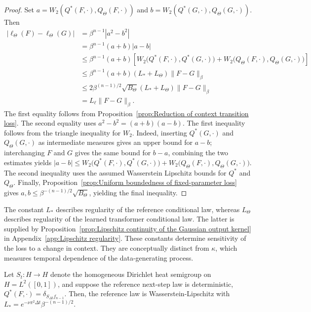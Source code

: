 \begin{proof}
Set \(a=W_2(Q^*(F,\cdot),Q_\Theta(F,\cdot))\) and \(b=W_2(Q^*(G,\cdot),Q_\Theta(G,\cdot))\). Then
\[
\begin{aligned}
|\ell_\Theta(F)-\ell_\Theta(G)|
&=
\beta^{n-1}
|a^2-b^2|
\\
&=
\beta^{n-1}
(a+b)|a-b|
\\
&\leqslant
\beta^{n-1}
(a+b)
\left[
W_2
\bigl(
Q^*(F,\cdot),
Q^*(G,\cdot)
\bigr)
+
W_2
\bigl(
Q_\Theta(F,\cdot),
Q_\Theta(G,\cdot)
\bigr)
\right]
\\
&\leqslant
\beta^{n-1}
(a+b)
(L_*+L_\Theta)
\|F-G\|_\beta
\\
&\leqslant
2
\beta^{(n-1)/2}
\sqrt{B_\Theta}
(L_*+L_\Theta)
\|F-G\|_\beta \\
&= L_\ell\|F-G\|_\beta.
\end{aligned}
\]
The first equality follows from Proposition~\ref{prop:Reduction of context transition loss}. The second equality uses \(a^2-b^2=(a+b)(a-b)\). The first inequality follows from the triangle inequality for \(W_2\). Indeed, inserting \(Q^*(G,\cdot)\) and \(Q_\Theta(G,\cdot)\) as intermediate measures gives an upper bound for \(a-b\); interchanging \(F\) and \(G\) gives the same bound for \(b-a\), combining the two estimates yields
\(
|a-b|
\leqslant
W_2\bigl(Q^*(F,\cdot),Q^*(G,\cdot)\bigr)
+
W_2\bigl(Q_\Theta(F,\cdot),Q_\Theta(G,\cdot)\bigr)
\). The second inequality uses the assumed Wasserstein Lipschitz bounds for \(Q^*\) and \(Q_\Theta\). Finally, Proposition~\ref{prop:Uniform boundedness of fixed-parameter loss} gives \(a,b\leqslant\beta^{-(n-1)/2}\sqrt{B_\Theta}\), yielding the final inequality.
\end{proof}

The constant \(L_*\) describes regularity of the reference conditional law, whereas \(L_\Theta\) describes regularity of the learned transformer conditional law. The latter is supplied by Proposition~\ref{prop:Lipschitz continuity of the Gaussian output kernel} in Appendix~\ref{app:Lipschitz regularity}. These constants determine sensitivity of the loss to a change in context. They are conceptually distinct from \(\kappa\), which measures temporal dependence of the data-generating process.

\begin{example}
Let \(S_t:H\to H\) denote the homogeneous Dirichlet heat semigroup on \(H=L^2([0,1])\), and suppose the reference next-step law is deterministic, \(Q^*(F,\cdot)=\delta_{S_{\Delta t}f_{n-1}}\). Then, the reference law is Wasserstein-Lipschitz with
\(
L_*
=
e^{-\nu\pi^2\Delta t}
\beta^{-(n-1)/2}.
\)
\end{example}

